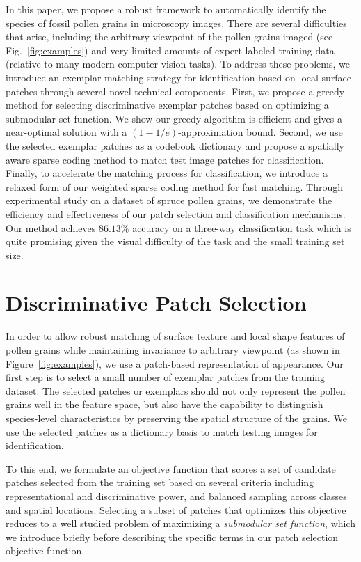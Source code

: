 \documentclass[10pt,twocolumn,letterpaper]{article}
\begin{document}
In this paper, we propose a robust framework to automatically identify the
species of fossil pollen grains in microscopy images.  There are several
difficulties that arise, including the arbitrary viewpoint of the pollen grains
imaged (see Fig.~\ref{fig:examples}) and very limited amounts of expert-labeled
training data (relative to many modern computer vision tasks).  To address
these problems, we introduce an exemplar matching strategy for identification
based on local surface patches through several novel technical components.
First, we propose a greedy method for selecting discriminative exemplar patches
based on optimizing a submodular set function.  We show our greedy algorithm is
efficient and gives a near-optimal solution with a $(1-1/e)$-approximation bound.
Second, we use the selected exemplar patches as a codebook dictionary and
propose a spatially aware sparse coding method to match test
image patches for classification.  Finally, to accelerate the matching process for classification,
we introduce a relaxed form of our weighted sparse coding method
for fast matching.  Through experimental study on a dataset of spruce pollen
grains, we demonstrate the efficiency and effectiveness of our patch selection
and classification mechanisms.  Our method achieves $86.13\%$ accuracy on a
three-way classification task which is quite promising given the visual
difficulty of the task and the small training set size.

\section{Discriminative Patch Selection}
In order to allow robust matching of surface texture and local shape features
of pollen grains while maintaining invariance to arbitrary viewpoint (as shown
in Figure~\ref{fig:examples}), we use a patch-based representation of
appearance.  Our first step is to select a small number of exemplar patches
from the training dataset.  The selected patches or exemplars should not only
represent the pollen grains well in the feature space, but also have the
capability to distinguish species-level characteristics by preserving the
spatial structure of the grains.
We use the selected patches as a dictionary basis to match testing images for identification.

To this end, we formulate an objective function that scores a set of candidate
patches selected from the training set based on several criteria including
representational and discriminative power, and balanced sampling across classes
and spatial locations. Selecting a subset of patches that optimizes this
objective reduces to a well studied problem of maximizing a {\em submodular set
function}, which we introduce briefly before describing the specific terms in
our patch selection objective function.
\end{document}
